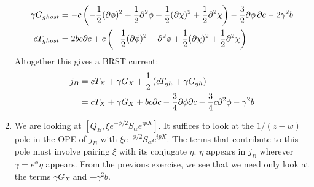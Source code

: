 \documentclass[11pt, class=article, crop=false]{standalone}
\begin{document}
\begin{enumerate}
\[\begin{aligned}
		\gamma G_{ghost} &= -c \left(-\frac12 (\partial \phi)^2 + \frac12 \partial^2 \phi + \frac12 (\partial\chi)^2 + \frac12 \partial^2 \chi\right) - \frac32 \partial \phi\, \partial c - 2 \gamma^2 b\\
		c T_{ghost} &= 2 b c \partial c + c \left(-\frac12 (\partial \phi)^2 - \partial^2 \phi + \frac12 (\partial\chi)^2 + \frac12 \partial^2 \chi \right)
	\end{aligned}
	\]
	Altogether this gives a BRST current:
	\[
	\begin{aligned}
		j_B &= c T_X + \gamma G_X +  \frac12 \left(c T_{gh} + \gamma G_{gh} \right)\\
		&=  c T_X + \gamma G_X + b c \partial c - \frac34 \partial \phi \partial c - \frac34 c \partial^2 \phi - \gamma^2 b
	\end{aligned}
	\]
	\item We are looking at $[Q_B, \xi e^{-\phi/2} S_\alpha e^{i p X}]$. It suffices to look at the $1/(z-w)$ pole in the OPE of $j_B$ with $\xi e^{-\phi/2} S_\alpha e^{i p X}$. The terms that contribute to this pole must involve pairing $\xi$ with its conjugate $\eta$. $\eta$ appears in $j_B$ wherever $\gamma = e^{\phi} \eta$ appears. From the previous exercise, we see that we need only look at the terms $\gamma G_X$ and $-\gamma^2 b$.
	

\end{enumerate}
\end{document}
